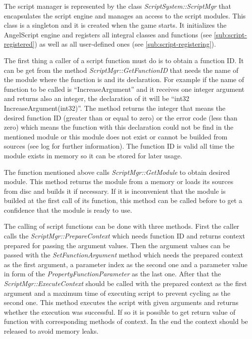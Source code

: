The script manager is represented by the class \emph{ScriptSystem::ScriptMgr} that encapsulates the script engine and manages an access to the script modules. This class is a singleton and it is created when the game starts. It initializes the AngelScript engine and registers all integral classes and functions (see \ref{sub:script-registered}) as well as all user-defined ones (see \ref{sub:script-registering}).

The first thing a caller of a script function must do is to obtain a function ID. It can be get from the method \emph{ScriptMgr::GetFunctionID} that needs the name of the module where the function is and its declaration. For example if the name of function to be called is ``IncreaseArgument'' and it receives one integer argument and returns also an integer, the declaration of it will be ``int32 IncreaseArgument(int32)''. The method returns the integer that means the desired function ID (greater than or equal to zero) or the error code (less than zero) which means the function with this declaration could not be find in the mentioned module or this module does not exist or cannot be builded from sources (see log for further information). The function ID is valid all time the module exists in memory so it can be stored for later usage.

The function mentioned above calls \emph{ScriptMgr::GetModule} to obtain desired module. This method returns the module from a memory or loads its sources from disc and builds it if necessary. If it is inconvenient that the module is builded at the first call of its function, this method can be called before to get a confidence that the module is ready to use.

The calling of script functions can be done with three methods. First the caller calls the \emph{ScriptMgr::PrepareContext} which needs function ID and returns context prepared for passing the argument values. Then the argument values can be passed with the \emph{SetFunctionArgument} method which needs the prepared context as the first argument, a parameter index as the second one and a parameter value in form of the \emph{PropertyFunctionParameter} as the last one. After that the \emph{ScriptMgr::ExecuteContext} should be called with the prepared context as the first argument and a maximum time of executing script to prevent cycling as the second one. This method executes the script with given arguments and returns whether the execution was successful. If so it is possible to get return value of function with corresponding methods of context. In the end the context should be released to avoid memory leaks.

